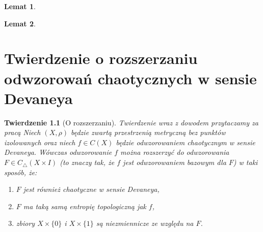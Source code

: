 \documentclass[licencjacka]{pwr_wmat_praca_dyplomowa}
\theoremstyle{plain}
\newtheorem{theorem}{Twierdzenie}
\numberwithin{theorem}{chapter}
\newtheorem{lemma}[theorem]{Lemat}
\theoremstyle{definition}
\numberwithin{theorem}{chapter}
\begin{document}
\begin{lemma}
\label{y0_rozne_od_0_i_1_implikuje_pr2Hrx0y0_rozne_od_0_i_1}
\end{lemma}

\begin{lemma}
\label{przypadek1_daje_odwzorowanie_G_bliskie_H}
\end{lemma}





\chapter{Twierdzenie o rozszerzaniu odwzorowań chaotycznych w sensie Devaneya}
\begin{theorem}[O rozszerzaniu]\label{twierdzenie_glowne}
Twierdzenie wraz z dowodem przytaczamy za pracą \cite{balibrea2003topological}
Niech $(X, \rho)$ będzie zwartą przestrzenią metryczną bez punktów izolowanych oraz niech $f \in C(X)$ będzie odwzorowaniem chaotycznym w sensie Devaneya. Wówczas odwzorowanie $f$ można rozszerzyć do odwzorowania $F \in C_{\triangle}(X \times I)$ (to znaczy tak, że $f$ jest odwzorowaniem bazowym dla $F$) w taki sposób, że:
\begin{enumerate}[label=(\roman*)]
\item\label{twierdzenie_glowne_a} $F$ jest również chaotyczne w sensie Devaneya, 
\item\label{twierdzenie_glowne_b} $F$ ma taką samą entropię topologiczną jak $f$, 
\item\label{twierdzenie_glowne_c} zbiory $X \times \{0\}$ i $X \times \{1\}$ są niezmiennicze ze względu na $F$.
\end{enumerate}
\end{theorem}
\end{document}
